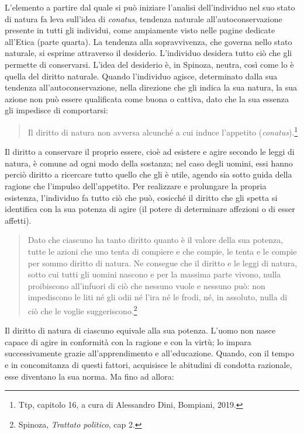 L’elemento a partire dal quale si può iniziare l’analisi dell’individuo nel suo stato di natura
fa leva sull’idea di \textit{conatus}, tendenza naturale all’autoconservazione presente in tutti gli individui, come ampiamente visto nelle pagine dedicate all'Etica (parte quarta). La tendenza alla sopravvivenza, che governa nello stato naturale, si
esprime attraverso il desiderio. L’individuo desidera tutto ciò che gli permette
di conservarsi. L’idea del desiderio è, in Spinoza, neutra, così
come lo è quella del diritto naturale. Quando l’individuo agisce, determinato
dalla sua tendenza all’autoconservazione, nella direzione che gli indica la sua
natura, la sua azione non può essere qualificata come buona o cattiva, dato che
la sua essenza gli impedisce di comportarsi:

\begin{quotation}
	\small Il diritto di natura non avversa alcunché a cui induce l'appetito (\textit{conatus}).\footnote{Ttp, capitolo 16, a cura di Alessandro Dini, Bompiani, 2019.}
\end{quotation}

Il diritto a conservare il proprio essere, cioè ad esistere e agire secondo le leggi di natura, è comune ad ogni modo della sostanza; nel caso degli uomini, essi hanno perciò diritto a ricercare tutto quello che gli è utile, agendo sia sotto guida della ragione che l'impulso dell'appetito. Per realizzare e prolungare la propria esistenza, l’individuo fa tutto ciò che
può, cosicché il diritto che gli spetta si identifica con la sua potenza di agire (il potere di determinare affezioni o di esser affetti).

\begin{quotation}
	\small Dato che ciascuno ha tanto diritto quanto è il valore della sua potenza, tutte
	le azioni che uno tenta di compiere e che compie, le tenta e le compie per sommo
	diritto di natura. Ne consegue che il diritto e le leggi di natura, sotto cui tutti gli
	uomini nascono e per la massima parte vivono, nulla proibiscono all’infuori di ciò
	che nessuno vuole e nessuno può: non impediscono le liti né gli odii né l’ira né le
	frodi, né, in assoluto, nulla di ciò che le voglie suggeriscono.\footnote{Spinoza, \textit{Trattato politico}, cap 2.}
	
\end{quotation}

Il diritto di natura di ciascuno equivale alla sua potenza. L’uomo
non nasce capace di agire in conformità con la ragione e con la virtù; lo impara successivamente grazie all’apprendimento e all’educazione. Quando, con il tempo
e in concomitanza di questi fattori, acquisisce le abitudini di condotta razionale,
esse diventano la sua norma. Ma fino ad allora:

